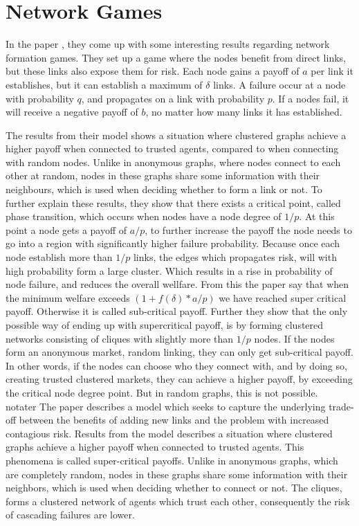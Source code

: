 \chapter{Network Games}
\label{chp:networkgames} 

In the paper \cite{contagion}, they come up with some interesting results regarding network formation games. 
They set up a game where the nodes benefit from direct links, but these links also expose them for risk. 
Each node gains a payoff of  $a$ per link it establishes, but it can establish a maximum of $\delta$ links.
A failure occur at a node with probability $q$, and propagates on a link with probability $p$. If a nodes fail, it will receive a negative payoff of $b$, no matter how many links it has established.

The results from their model shows a situation where clustered graphs achieve a higher payoff when connected to trusted agents, compared to when connecting with random nodes. Unlike in anonymous graphs, where nodes connect to each other at random, nodes in these graphs share some information with their neighbours, which is used when deciding whether to form a link or not. 
To further explain these results, they show that there exists a critical point, called phase transition, which occurs when nodes have a node degree of $1/p$. 
At this point a node gets a payoff of $a/p$, to further increase the payoff the node needs to go into a region with significantly higher failure probability. 
Because once each node establish more than $1/p$ links, the edges which propagates risk, will with high probability form a large cluster. Which results in a rise in probability of node failure, and reduces the overall wellfare.
From this the paper say that when the minimum welfare exceeds 
$(1+f(\delta)*a/p)
$
we have reached super critical payoff. Otherwise it is called sub-critical payoff. 
Further they show that the only possible way of ending up with supercritical payoff, is by forming clustered networks consisting of cliques with slightly more than $1/p$ nodes. 
If the nodes form an anonymous market, random linking, they can only get sub-critical payoff. 
In other words, if the nodes can choose who they connect with, and by doing so, creating trusted clustered markets, they can achieve a higher payoff, by exceeding the critical node degree point. But in random graphs, this is not possible.  
\\notater
The paper \cite{contagion} describes a model which seeks to capture the underlying trade-off between the benefits of adding new links and the problem with increased contagious risk. Results from the model describes a situation where clustered graphs achieve a higher payoff when connected to trusted agents. This phenomena is called super-critical payoffs. Unlike in anonymous graphs, which are completely random, nodes in these graphs share some information with their neighbors, which is used when deciding whether to connect or not. The cliques, forms a clustered network of agents which trust each other, consequently the risk of cascading failures are lower.
